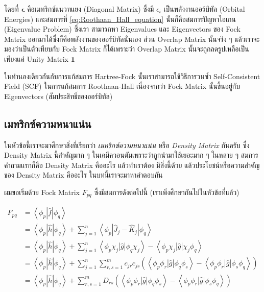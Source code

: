 \noindent โดยที่ $\boldsymbol{\epsilon}$ คือเมทริกซ์แนวทแยง (Diagonal Matrix) ซึ่งมี $\epsilon_i$ เป็นพลังงานออร์บิทัล
(Orbital Energies) และสมการที่ \eqref{eq:Roothaan_Hall_equation} นั้นก็คือสมการปัญหาไอเกน (Eigenvalue Problem) ซึ่งเรา%
สามารถหา Eigenvalues และ Eigenvectors ของ Fock Matrix ออกมาได้ซึ่งก็คือพลังงานของออร์บิทัลนั่นเอง ส่วน Overlap Matrix
นั้นจริง ๆ แล้วเราจะมองว่าเป็นตัวเทียบกับ Fock Matrix ก็ได้เพราะว่า Overlap Matrix นั้นจะถูกลดรูปเหลือเป็นเพียงแค่ Unity Matrix
$\bm{1}$

ในทำนองเดียวกันกับการแก้สมการ Hartree-Fock นั้นเราสามารถใช้วิธีการวนซ้ำ Self-Consistent Field (SCF) ในการแก้สมการ
Roothaan-Hall เนื่องจากว่า Fock Matrix นั้นขึ้นอยู่กับ Eigenvectors (สัมประสิทธิ์ของออร์บิทัล)

\subsection{เมทริกซ์ความหนาแน่น}

ในหัวข้อนี้เราจะมาศึกษาสิ่งที่เรียกว่า \textit{เมทริกซ์ความหนาแน่น} หรือ \textit{Density Matrix} กันครับ ซึ่ง Density Matrix
นี้สำคัญมาก ๆ ในเคมีควอนตัมเพราะว่าถูกนำมาใช้เยอะมาก ๆ ในหลาย ๆ สมการ คำถามแรกก็คือ Density Matrix คืออะไร แล้วทำเราต้อง%
มีสิ่งนี้ด้วย แล้วประโยชน์หรือความสำคัญของ Density Matrix คืออะไร ในบทนี้เราจะมาหาคำตอบกัน

ผมขอเริ่มด้วย Fock Matrix $F_{p q}$  ซึ่งมีสมการดังต่อไปนี้ (เราเพิ่งศึกษากันไปในหัวข้อที่แล้ว)

\begin{equation}
  \label{eq:Fock_Matrix_Elements}
  \begin{aligned}
    F_{p q}
     & =\left\langle\phi_p|\hat{f}| \phi_q\right\rangle             \\
     & = \left\langle\phi_p|\hat{h}| \phi_q\right\rangle
    + \sum_{j=1}^n
    \left\langle\phi_p\left|\hat{J}_j
    - \hat{K}_j\right| \phi_q\right\rangle                          \\
     & =\left\langle\phi_p|\hat{h}| \phi_q\right\rangle
    + \sum_{j=1}^n
    \left\langle\phi_p \chi_j|\hat{g}| \phi_q \chi_j\right\rangle
    - \left\langle\phi_p \chi_j|\hat{g}| \chi_j \phi_q\right\rangle \\
     & =\left\langle\phi_p|\hat{h}| \phi_q\right\rangle
    + \sum_{j=1}^n \sum_{r, s=1}^m
    c_{j r} c_{j s}
    \left(
    \left\langle\phi_p \phi_r|\hat{g}| \phi_q \phi_s\right\rangle
    - \left\langle\phi_p \phi_r|\hat{g}| \phi_s \phi_q\right\rangle
    \right)                                                         \\
     & =\left\langle\phi_p|\hat{h}| \phi_q\right\rangle
    + \sum_{r, s=1}^m D_{r s}
    \left(
    \left\langle\phi_p \phi_r|\hat{g}| \phi_q \phi_s\right\rangle
    - \left\langle\phi_p \phi_r|\hat{g}| \phi_s \phi_q\right\rangle
    \right)
  \end{aligned}
\end{equation}

